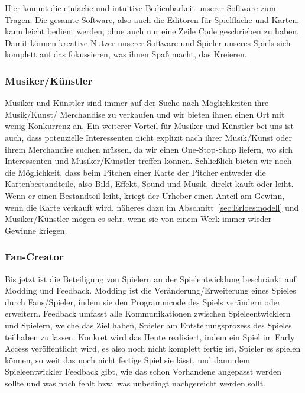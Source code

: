 \documentclass[fontsize=11, a4aper]{scrartcl}
\begin{document}
Hier kommt die einfache und intuitive Bedienbarkeit unserer Software zum Tragen. Die gesamte Software, also auch die Editoren für Spielfläche und Karten, kann leicht bedient werden, ohne auch nur eine Zeile Code geschrieben zu haben. Damit können kreative Nutzer unserer Software und Spieler unseres Spiels sich komplett auf das fokussieren, was ihnen Spaß macht, das Kreieren.

\subsubsection{Musiker/Künstler} \label{subsubsec:Wertangebot:Musiker_Kuenstler}

Musiker und Künstler sind immer auf der Suche nach Möglichkeiten ihre Musik/Kunst/ Merchandise zu verkaufen und wir bieten ihnen einen Ort mit wenig Konkurrenz an. Ein weiterer Vorteil für Musiker und Künstler bei uns ist auch, dass potenzielle Interessenten nicht explizit nach ihrer Musik/Kunst oder ihrem Merchandise suchen müssen, da wir einen One-Stop-Shop liefern, wo sich Interessenten und Musiker/Künstler treffen können. Schließlich bieten wir noch die Möglichkeit, dass beim Pitchen einer Karte der Pitcher entweder die Kartenbestandteile, also Bild, Effekt, Sound und Musik, direkt kauft oder leiht. Wenn er einen Bestandteil leiht, kriegt der Urheber einen Anteil am Gewinn, wenn die Karte verkauft wird, näheres dazu im Abschnitt~\ref{sec:Erloesmodell} und Musiker/Künstler mögen es sehr, wenn sie von einem Werk immer wieder Gewinne kriegen.

\subsubsection{Fan-Creator} \label{subsubsec:Wertangebot:Fan_Creator}

Bis jetzt ist die Beteiligung von Spielern an der Spielentwicklung beschränkt auf Modding und Feedback. Modding ist die Veränderung/Erweiterung eines Spieles durch Fans/Spieler, indem sie den Programmcode des Spiels verändern oder erweitern. Feedback umfasst alle Kommunikationen zwischen Spieleentwicklern und Spielern, welche das Ziel haben, Spieler am Entstehungsprozess des Spieles teilhaben zu lassen. Konkret wird das Heute realisiert, indem ein Spiel im \glqq Early Access\grqq{} veröffentlicht wird, es also noch nicht komplett fertig ist, Spieler es spielen können, so weit das noch nicht fertige Spiel sie lässt, und dann dem Spieleentwickler Feedback gibt, wie das schon Vorhandene angepasst werden sollte und was noch fehlt bzw. was unbedingt nachgereicht werden sollt.\hfill\newline
\end{document}
